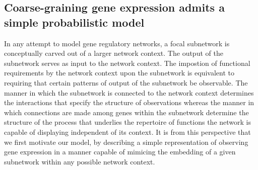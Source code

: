 \subsection{Coarse-graining gene expression admits a simple probabilistic model}
In any attempt to model gene regulatory networks, a focal subnetwork is conceptually carved out of a larger network context. The output of the subnetwork serves as input to the network context. The impostion of functional requirements by the network context upon the subnetwork is equivalent to requiring that certain patterns of output of the subnetwork be observable. The manner in which the subnetwork is connected to the network context determines the interactions that specify the structure of observations whereas the manner in which connections are made among genes within the subnetwork determine the structure of the process that underlies the repertoire of functions the network is capable of displaying independent of its context. It is from this perspective that we first motivate our model, by describing a simple representation of observing gene expression in a manner capable of mimicing the embedding of a given subnetwork within any possible network context.

